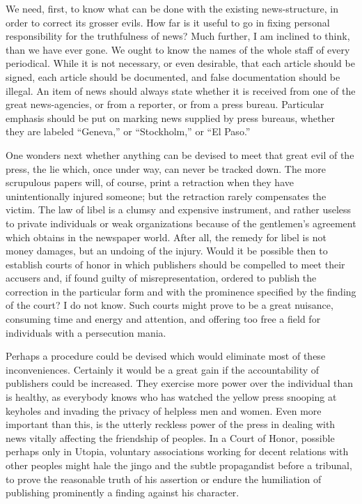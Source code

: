 \documentclass[openany,nobib,twoside,nohyper]{tufte-book}
\begin{document}
We need, first, to know what can be done with the existing
news-structure, in order to correct its grosser evils. How far is it
useful to go in fixing personal responsibility for the truthfulness of
news? Much further, I am inclined to think, than we have ever gone. We
ought to know the names of the whole staff of every periodical. While it
is not necessary, or even desirable, that each article should be signed,
each article should be documented, and false documentation should be
illegal. An item of news should always state whether it is received from
one of the great news-agencies, or from a reporter, or from a press
bureau. Particular emphasis should be put on marking news supplied by
press bureaus, whether they are labeled ``Geneva,'' or ``Stockholm,'' or
``El Paso.''

One wonders next whether anything can be devised to meet that great evil
of the press, the lie which, once under way, can never be tracked down.
The more scrupulous papers will, of course, print a retraction when they
have unintentionally injured someone; but the retraction rarely
compensates the victim. The law of libel is a clumsy and expensive
instrument, and rather useless to private individuals or weak
organizations because of the gentlemen's agreement which obtains in the
newspaper world. After all, the remedy for libel is not money damages,
but an undoing of the injury. Would it be possible then to establish
courts of honor in which publishers should be compelled to meet their
accusers and, if found guilty of misrepresentation, ordered to publish
the correction in the particular form and with the prominence specified
by the finding of the court? I do not know. Such courts might prove to
be a great nuisance, consuming time and energy and attention, and
offering too free a field for individuals with a persecution mania.

Perhaps a procedure could be devised which would eliminate most of these
inconveniences. Certainly it would be a great gain if the accountability
of publishers could be increased. They exercise more power over the
individual than is healthy, as everybody knows who has watched the
yellow press snooping at keyholes and invading the privacy of helpless
men and women. Even more important than this, is the utterly reckless
power of the press in dealing with news vitally affecting the friendship
of peoples. In a Court of Honor, possible perhaps only in Utopia,
voluntary associations working for decent relations with other peoples
might hale the jingo and the subtle propagandist before a tribunal, to
prove the reasonable truth of his assertion or endure the humiliation of
publishing prominently a finding against his character.
\end{document}
